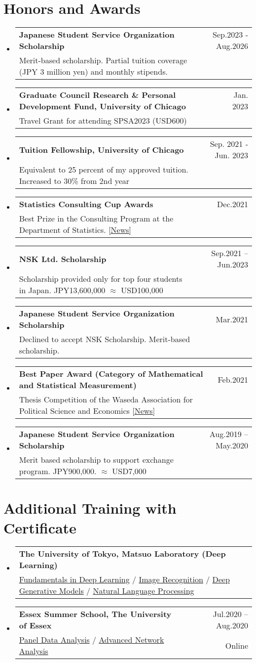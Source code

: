 \documentclass[letterpaper,11pt]{article} %
\makeatletter
\newcommand{\CVSubheading}[4]{
  \vspace{-2pt}\item
    \begin{tabular*}{0.97\textwidth}[t]{l@{\extracolsep{\fill}}r}
      \textbf{#1} & #2 \\
      \small#3 & \small #4 \\
    \end{tabular*}\vspace{-7pt}
}
\newcommand{\CVSubHeadingListStart}{\begin{itemize}[leftmargin=0.5cm, label={}]}
\newcommand{\CVSubHeadingListEnd}{\end{itemize}}
\makeatother
\begin{document}
\section{Honors and Awards}
  \CVSubHeadingListStart
\CVSubheading
      {Japanese Student Service Organization Scholarship}{Sep.2023 - Aug.2026}
      {Merit-based scholarship. Partial tuition coverage (JPY 3 million yen) and monthly stipends.}{}  
    \CVSubheading %
     {Graduate Council Research \& Personal Development Fund, University of Chicago}{Jan. 2023}
    {Travel Grant for attending SPSA2023 (USD600)}{}
    \CVSubheading
      {Tuition Fellowship, University of Chicago}
      {Sep. 2021 - Jun. 2023}
      {Equivalent to 25 percent of my approved tuition. Increased to 30\% from 2nd year}{}
    \CVSubheading
      {Statistics Consulting Cup Awards}{Dec.2021}
      {Best Prize in the Consulting Program at the Department of Statistics. 
      \textcolor{sanguria}{[\underline{\href{https://stat.uchicago.edu/news/article/the-fall-2021-consulting-cup-award/}{News}}]}
      }{}
    \CVSubheading
      {NSK Ltd. Scholarship}{Sep.2021 -- Jun.2023}
      {Scholarship provided only for top four students in Japan. JPY13,600,000 $\approx$ USD100,000}{}
    \CVSubheading
      {Japanese Student Service Organization Scholarship}{Mar.2021}
      {Declined to accept NSK Scholarship. Merit-based scholarship.}{}
    \CVSubheading
      {Best Paper Award (Category of Mathematical and Statistical Measurement)}{Feb.2021}
      {Thesis Competition of the Waseda Association for Political Science and Economics  \textcolor{sanguria}{[\underline{\href{https://www.waseda.jp/fpse/pse/news/2021/02/08/12784/}{News}}]}
      }{}
    \CVSubheading
      {Japanese Student Service Organization Scholarship}{Aug.2019 -- May.2020}
      {Merit based scholarship to support exchange program. JPY900,000. $\approx$ USD7,000}{}
  \CVSubHeadingListEnd


\section{Additional Training with Certificate}
  \CVSubHeadingListStart
    \CVSubheading
      {The University of Tokyo, Matsuo Laboratory (Deep Learning)}{}
      {\textcolor{sanguria}{\href{https://www.dropbox.com/s/6ism7kpto4vm6bz/Matsuo\%20Labo\%20Fundamentals.pdf?dl=0}{Fundamentals in Deep Learning}}
       /  \textcolor{sanguria}{\href{https://www.dropbox.com/s/5z06mt1z06wlnyg/Matsuo\%20Labo\%20Image\%20Recognition.pdf?dl=0}{Image Recognition}}
       / \textcolor{sanguria}{\href{https://www.dropbox.com/s/euozc42m950jgb3/Matsuo\%20Labo\%20Generative\%20Models.pdf?dl=0}{Deep Generative Models}}
       / \textcolor{sanguria}{\href{https://www.dropbox.com/s/45g6c7y5qxpdsb5/Matsuo\%20Labo\%20NLP.pdf?dl=0}{Natural Language Processing}}
       }{}
     \CVSubheading
      {Essex Summer School, The University of Essex}{Jul.2020 -- Aug.2020}
      {\textcolor{sanguria}{\href{https://www.dropbox.com/s/rsligjfbuhfxppv/Essex\%20Panel.pdf?dl=0}{Panel Data Analysis}}
      / 
      \textcolor{sanguria}{\href{https://www.dropbox.com/s/dqc4y6a5rpnkip6/Essex\%20Network.pdf?dl=0}{Advanced Network Analysis}}
      }{Online}
  \CVSubHeadingListEnd
\end{document}
